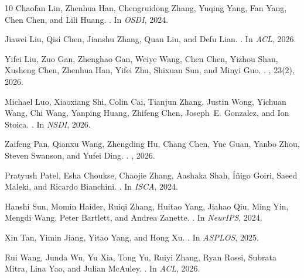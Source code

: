 \begin{thebibliography}{10}
Chaofan Lin, Zhenhua Han, Chengruidong Zhang, Yuqing Yang, Fan Yang, Chen Chen,
  and Lili Huang.
.
\newblock In {\em OSDI}, 2024.

Jiawei Liu, Qisi Chen, Jianshu Zhang, Quan Liu, and Defu Lian.
.
\newblock In {\em ACL}, 2026.

Yifei Liu, Zuo Gan, Zhenghao Gan, Weiye Wang, Chen Chen, Yizhou Shan, Xusheng
  Chen, Zhenhua Han, Yifei Zhu, Shixuan Sun, and Minyi Guo.
.
,
  23(2), 2026.

Michael Luo, Xiaoxiang Shi, Colin Cai, Tianjun Zhang, Justin Wong, Yichuan
  Wang, Chi Wang, Yanping Huang, Zhifeng Chen, Joseph~E. Gonzalez, and Ion
  Stoica.
.
\newblock In {\em NSDI}, 2026.

Zaifeng Pan, Qianxu Wang, Zhengding Hu, Chang Chen, Yue Guan, Yanbo Zhou,
  Steven Swanson, and Yufei Ding.
.
, 2026.

Pratyush Patel, Esha Choukse, Chaojie Zhang, Aashaka Shah, {\'I}{\~n}igo Goiri,
  Saeed Maleki, and Ricardo Bianchini.
.
\newblock In {\em ISCA}, 2024.

Hanshi Sun, Momin Haider, Ruiqi Zhang, Huitao Yang, Jiahao Qiu, Ming Yin,
  Mengdi Wang, Peter Bartlett, and Andrea Zanette.
.
\newblock In {\em NeurIPS}, 2024.

Xin Tan, Yimin Jiang, Yitao Yang, and Hong Xu.
.
\newblock In {\em ASPLOS}, 2025.

Rui Wang, Junda Wu, Yu Xia, Tong Yu, Ruiyi Zhang, Ryan Rossi, Subrata Mitra,
  Lina Yao, and Julian McAuley.
.
\newblock In {\em ACL}, 2026.


\end{thebibliography}
